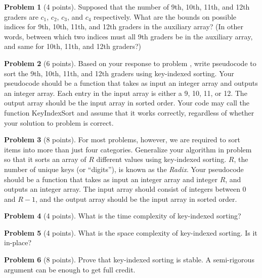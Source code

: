 \documentclass{exam}
\theoremstyle{definition}
\newtheorem{problem}{Problem}[section]
\theoremstyle{definition}
\begin{document}
\begin{problem}[4 points]
    Supposed that the number of 9th, 10th, 11th, and 12th graders are $c_{1}$, $c_{2}$, $c_{3}$, and $c_{4}$ respectively. What are the bounds on possible indices for 9th, 10th, 11th, and 12th graders in the auxiliary array? (In other words, between which two indices must all 9th graders be in the auxiliary array, and same for 10th, 11th, and 12th graders?)
\end{problem}

\begin{problem}[6 points]
    Based on your response to problem , write pseudocode to sort the 9th, 10th, 11th, and 12th graders using key-indexed sorting. Your pseudocode should be a function that takes as input an integer array and outputs an integer array. Each entry in the input array is either a 9, 10, 11, or 12. The output array should be the input array in sorted order. Your code may call the function KeyIndexSort and assume that it works correctly, regardless of whether your solution to problem  is correct. 
\end{problem} 

\begin{problem}[8 points]
    For most problems, however, we are required to sort items into more than just four categories. Generalize your algorithm in problem  so that it sorts an array of $R$ different values using key-indexed sorting. $R$, the number of unique keys (or ``digits''), is known as the \textit{Radix}. Your pseudocode should be a function that takes as input an integer array and integer $R$, and outputs an integer array. The input array should consist of integers between $0$ and $R-1$, and the output array should be the input array in sorted order. 
\end{problem}


\begin{problem}[4 points]
    What is the time complexity of key-indexed sorting?
\end{problem}

\begin{problem}[4 points]
    What is the space complexity of key-indexed sorting. Is it in-place? 
\end{problem}

\begin{problem}[8 points]
    Prove that key-indexed sorting is stable. A semi-rigorous argument can be enough to get full credit. 
\end{problem}
\end{document}
